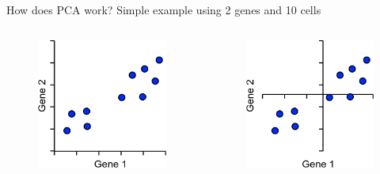 \begin{frame}[allowframebreaks]{How does PCA work?}    
    Simple example using 2 genes and 10 cells
    \vspace{1cm}
    \begin{columns}
    \begin{column}{0.5\textwidth}
        \begin{figure}
            \centering
            \includegraphics[width=1\textwidth,keepaspectratio]{images/dul/dim-reduce/points.png}
        \end{figure}
    \end{column}
    \begin{column}{0.5\textwidth}
        \begin{figure}
            \centering
            \includegraphics[width=1\textwidth,keepaspectratio]{images/dul/dim-reduce/points-separation.png}

\end{figure}
\end{column}
\end{columns}
\end{frame}

